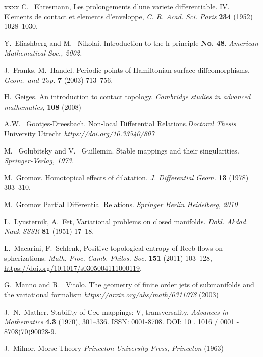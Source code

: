 \documentclass{amsart}
\theoremstyle{definition}
\theoremstyle{remark}
\numberwithin{equation}{section}
\begin{document}
\begin{thebibliography}{xxxx}
    C. \ Ehresmann, {Les prolongements d’une variete differentiable. IV. Elements de contact
    et elements d’enveloppe,} \emph{C. R. Acad. Sci. Paris} \textbf{234} (1952) 1028–1030.

    Y.\ Eliashberg and M. \ Nikolai. {Introduction to the h-principle} \textbf{No. 48}. \emph{American Mathematical Soc., 2002.}

    J.\ Franks, M.\ Handel.
    {Periodic points of Hamiltonian surface diffeomorphisms.}
    \emph{Geom.\ and Top.} \textbf{7} (2003) 713--756.

    H.\ Geiges.
    {An introduction to contact topology.}
    \emph{Cambridge studies in advanced mathematics}, \textbf{108} (2008)

    A.W. \ Gootjes-Dreesbach. {Non-local Differential Relations.}\emph{Doctoral Thesis} University Utrecht \emph{https://doi.org/10.33540/807}

    M. \ Golubitsky and V. \ Guillemin. {Stable mappings and their singularities.}
    \emph{Springer-Verlag, 1973.}

    M.\ Gromov. 
    {Homotopical effects of dilatation.}
    \emph{J. Differential Geom.} \textbf{13} (1978) 303--310.


    M.\ Gromov {Partial Differential Relations.} \emph{Springer Berlin Heidelberg, 2010}



    L.\ Lyusternik, A.\ Fet, {Variational problems on closed manifolds.} \emph{Dokl. Akdad. Nauk SSSR}
\textbf{81} (1951) 17--18.

L.\ Macarini, F.\ Schlenk,
{Positive topological entropy of Reeb flows on spherizations.}
\emph{Math. Proc. Camb. Philos. Soc.} \textbf{151} (2011) 103--128, \url{https://doi.org/10.1017/s0305004111000119}.

    G.\ Manno and R. \ Vitolo. {The geometry of finite order jets of submanifolds and the variational formalism} \emph{https://arxiv.org/abs/math/0311078} (2003)

    J.\ N.\ Mather. {Stability of C{$\infty$} mappings: V, transversality.} \emph{Advances
in Mathematics} \textbf{4.3} (1970), 301--336. ISSN: 0001-8708. DOI: 10 . 1016 / 0001 -
8708(70)90028-9.

    J.\ Milnor, {Morse Theory} \emph{Princeton University Press, Princeton} (1963)


\end{thebibliography}
\end{document}
